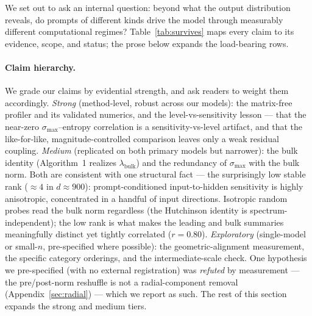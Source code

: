 \documentclass{article}
\begin{document}
We set out to ask an internal question: beyond what the output distribution reveals, do prompts of
different kinds drive the model through measurably different computational regimes?
Table~\ref{tab:survives} maps every claim to its evidence, scope, and status; the prose below expands
the load-bearing rows.

\paragraph{Claim hierarchy.} We grade our claims by evidential strength, and ask readers to weight them
accordingly. \emph{Strong} (method-level, robust across our models): the matrix-free profiler and its
validated numerics, and the level-vs-sensitivity lesson --- that the near-zero $\sigma_{\max}$--entropy
correlation is a sensitivity-vs-level artifact, and that the like-for-like, magnitude-controlled
comparison leaves only a weak residual coupling. \emph{Medium} (replicated on both primary models but
narrower): the bulk identity (Algorithm~1 realizes $\lambda_{\mathrm{bulk}}$) and the redundancy of
$\sigma_{\max}$ with the bulk norm. Both are consistent with one structural fact --- the surprisingly
low stable rank ($\approx4$ in $d\approx900$): prompt-conditioned input-to-hidden sensitivity is highly
anisotropic, concentrated in a handful of input directions. Isotropic random probes read the bulk norm
regardless (the Hutchinson identity is spectrum-independent); the low rank is what makes the leading
and bulk summaries meaningfully distinct yet tightly correlated ($r=0.80$). \emph{Exploratory} (single-model or small-$n$, pre-specified where
possible): the geometric-alignment measurement, the specific category orderings, and the
intermediate-scale check. One hypothesis we pre-specified (with no external registration) was \emph{refuted} by measurement --- the
pre/post-norm reshuffle is not a radial-component removal (Appendix~\ref{sec:radial}) --- which we
report as such. The rest of this section expands the strong and medium tiers.
\end{document}

